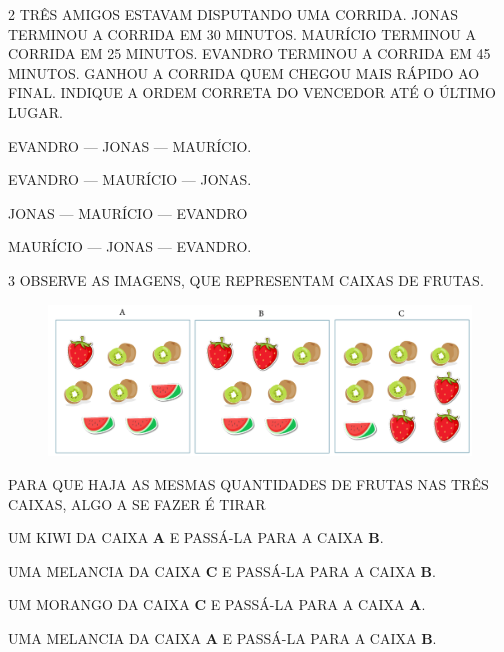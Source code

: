 \num{2} TRÊS AMIGOS ESTAVAM DISPUTANDO UMA CORRIDA. JONAS TERMINOU A CORRIDA EM 30
MINUTOS. MAURÍCIO TERMINOU A CORRIDA EM 25 MINUTOS. EVANDRO TERMINOU A
CORRIDA EM 45 MINUTOS. GANHOU A CORRIDA QUEM CHEGOU MAIS RÁPIDO AO FINAL. INDIQUE A
ORDEM CORRETA DO VENCEDOR ATÉ O ÚLTIMO LUGAR.

\begin{escolha}[itemsep=0pt]
\item EVANDRO --- JONAS --- MAURÍCIO.

\item EVANDRO --- MAURÍCIO --- JONAS.

\item JONAS --- MAURÍCIO --- EVANDRO

\item MAURÍCIO --- JONAS --- EVANDRO.
\end{escolha}

\pagebreak
\num{3} OBSERVE AS IMAGENS, QUE REPRESENTAM CAIXAS DE FRUTAS.

\begin{figure}[htpb!]
\centering
\includegraphics[width=\textwidth]{./media/SAEB_1ANO_MAT_FIGURA137.png}
\end{figure}

PARA QUE HAJA AS MESMAS QUANTIDADES DE FRUTAS NAS TRÊS CAIXAS, ALGO
A SE FAZER É TIRAR

\begin{escolha}[itemsep=0pt]
\item UM KIWI DA CAIXA \textbf{A} E PASSÁ-LA PARA A CAIXA \textbf{B}.

\item UMA MELANCIA DA CAIXA \textbf{C} E PASSÁ-LA PARA A CAIXA \textbf{B}.

\item UM MORANGO DA CAIXA \textbf{C} E PASSÁ-LA PARA A CAIXA \textbf{A}.

\item UMA MELANCIA DA CAIXA \textbf{A} E PASSÁ-LA PARA A CAIXA \textbf{B}.
\end{escolha}

